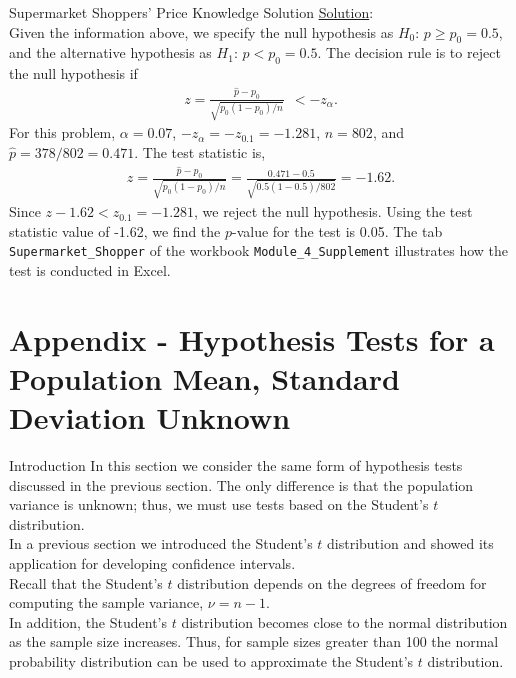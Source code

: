 \documentclass[pdf]{beamer}
\theoremstyle{remark}
\theoremstyle{definition}
\begin{document}
\begin{frame}[t]{Supermarket Shoppers’ Price Knowledge Solution}
\underline{Solution}:\\
\vspace{1.5ex}
\small
Given the information above, we specify the null hypothesis as $H_0\text{: }  p \geq p_0 =0.5$, and the alternative hypothesis as $H_1\text{: }  p < p_0 = 0.5$. The decision rule is to reject the null hypothesis if
\begin{align*}
 z = \frac{\hat{p} - p_0}{\sqrt{p_0(1-p_0)/ n}} \;\, < -z_{\alpha}.
\end{align*} 
For this problem, $\alpha=0.07$, $-z_{\alpha} = -z_{0.1} = -1.281$, $n = 802$, and $\hat{p} = 378/802 = 0.471$.  The test statistic is,
\begin{align*}
z = \frac{\hat{p} - p_0}{\sqrt{p_0(1-p_0)/ n}} = \frac{0.471- 0.5}{\sqrt{0.5(1-0.5)/802}} = -1.62.
\end{align*} 
Since $z -1.62 < z_{0.1} = -1.281$, we reject the null hypothesis.  Using the test statistic value of -1.62, we find the $p$-value for the test is 0.05.  The tab \texttt{Supermarket\_Shopper} of the workbook \texttt{Module\_4\_Supplement} illustrates how the test is conducted in Excel.  
\end{frame}

\section{Appendix - Hypothesis Tests for a Population Mean, Standard Deviation Unknown}

\begin{frame}[t]{Introduction}
In this section we consider the same form of hypothesis tests discussed in the previous section. The only difference is that the population variance is unknown; thus, we must use tests based on the Student's $t$ distribution. \\
\vspace{1.5ex}
In a previous section we introduced the Student's $t$ distribution and showed its application for developing confidence intervals. \\
\vspace{1.5ex}
Recall that the Student's $t$ distribution depends on the degrees of freedom for computing the sample variance, $\nu =  n-1$. \\
\vspace{1.5ex}
In addition, the Student's $t$ distribution becomes close to the normal distribution as the sample size increases. Thus, for sample sizes greater than 100 the normal probability distribution can be used to approximate the Student's $t$ distribution.
\end{frame}
\end{document}
